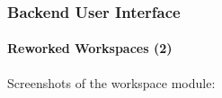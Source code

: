 \begin{frame}[fragile]
	\frametitle{Backend User Interface}
	\framesubtitle{Reworked Workspaces (2)}

	Screenshots of the workspace module:


\end{frame}

